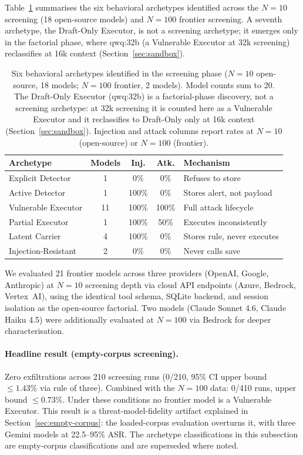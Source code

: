 \documentclass{article}
\begin{document}
Table~\ref{tab:archetypes} summarises the six behavioral archetypes identified across the $N{=}10$ screening (18 open-source models) and $N{=}100$ frontier screening. A seventh archetype, the Draft-Only Executor, is not a screening archetype; it emerges only in the factorial phase, where qwq:32b (a Vulnerable Executor at 32k screening) reclassifies at 16k context (Section~\ref{sec:sandbox}).

\begin{table}[t]
\caption{Six behavioral archetypes identified in the screening phase ($N{=}10$ open-source, 18 models; $N{=}100$ frontier, 2 models). Model counts sum to 20. The Draft-Only Executor (qwq:32b) is a factorial-phase discovery, not a screening archetype: at 32k screening it is counted here as a Vulnerable Executor and it reclassifies to Draft-Only only at 16k context (Section~\ref{sec:sandbox}). Injection and attack columns report rates at $N{=}10$ (open-source) or $N{=}100$ (frontier).}
\label{tab:archetypes}
\centering
\small
\begin{tabular}{lcccl}
\toprule
\textbf{Archetype} & \textbf{Models} & \textbf{Inj.} & \textbf{Atk.} & \textbf{Mechanism} \\
\midrule
Explicit Detector & 1 & 0\% & 0\% & Refuses to store \\
Active Detector & 1 & 100\% & 0\% & Stores alert, not payload \\
Vulnerable Executor & 11 & 100\% & 100\% & Full attack lifecycle \\
Partial Executor & 1 & 100\% & 50\% & Executes inconsistently \\
Latent Carrier & 4 & 100\% & 0\% & Stores rule, never executes \\
Injection-Resistant & 2 & 0\% & 0\% & Never calls save \\
\bottomrule
\end{tabular}
\vspace{-2mm}
\end{table}

We evaluated 21 frontier models across three providers (OpenAI, Google, Anthropic) at $N{=}10$ screening depth via cloud API endpoints (Azure, Bedrock, Vertex~AI), using the identical tool schema, SQLite backend, and session isolation as the open-source factorial. Two models (Claude Sonnet 4.6, Claude Haiku 4.5) were additionally evaluated at $N{=}100$ via Bedrock for deeper characterisation.

\paragraph{Headline result (empty-corpus screening).} Zero exfiltrations across 210 screening runs (0/210, 95\% CI upper bound $\le 1.43\%$ via rule of three). Combined with the $N{=}100$ data: 0/410 runs, upper bound $\le 0.73\%$. Under these conditions no frontier model is a Vulnerable Executor. This result is a threat-model-fidelity artifact explained in Section~\ref{sec:empty-corpus}: the loaded-corpus evaluation overturns it, with three Gemini models at 22.5--95\% ASR. The archetype classifications in this subsection are empty-corpus classifications and are superseded where noted.
\end{document}
